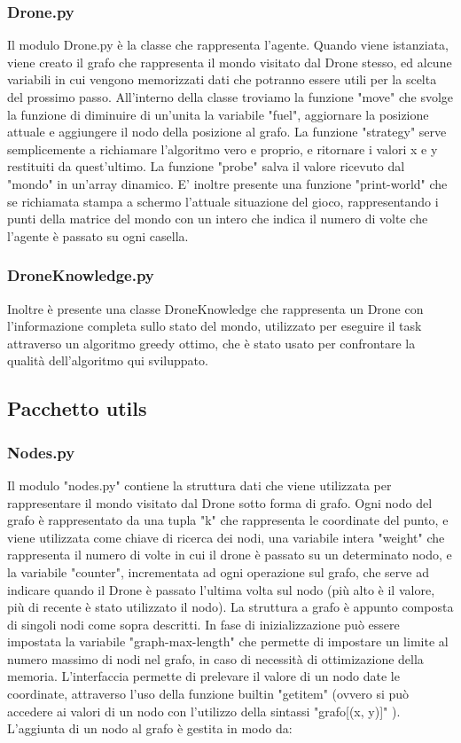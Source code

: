 \subsubsection{Drone.py}
Il modulo Drone.py è la classe che rappresenta l'agente. Quando viene istanziata, viene creato il grafo che rappresenta il mondo visitato dal Drone stesso, ed alcune variabili in cui vengono memorizzati dati che potranno essere utili per la scelta del prossimo passo. All'interno della classe troviamo la funzione "move" che svolge la funzione di diminuire di un'unita la variabile "fuel", aggiornare la posizione attuale e aggiungere il nodo della posizione al grafo. La funzione "strategy" serve semplicemente a richiamare l'algoritmo vero e proprio, e ritornare i valori x e y restituiti da quest'ultimo. La funzione "probe" salva il valore ricevuto dal "mondo" in un'array dinamico. E' inoltre presente una funzione "print-world" che se richiamata stampa a schermo l'attuale situazione del gioco, rappresentando i punti della matrice del mondo con un intero che indica il numero di volte che l'agente è passato su ogni casella.

\subsubsection{DroneKnowledge.py}
Inoltre è presente una classe DroneKnowledge che rappresenta un Drone con l'informazione completa sullo stato del mondo, utilizzato per eseguire il task attraverso un algoritmo greedy ottimo, che è stato usato per confrontare la qualità dell'algoritmo qui sviluppato.

\subsection{Pacchetto utils}

\subsubsection{Nodes.py}
Il modulo "nodes.py" contiene la struttura dati che viene utilizzata per rappresentare il mondo visitato dal Drone sotto forma di grafo. Ogni nodo del grafo è rappresentato da una tupla "k" che rappresenta le coordinate del punto, e viene utilizzata come chiave di ricerca dei nodi, una variabile intera "weight" che rappresenta il numero di volte in cui il drone è passato su un determinato nodo, e la variabile "counter", incrementata ad ogni operazione sul grafo, che serve ad indicare quando il Drone è passato l'ultima volta sul nodo (più alto è il valore, più di recente è stato utilizzato il nodo). 
La struttura a grafo è appunto composta di singoli nodi come sopra descritti. In fase di inizializzazione può essere impostata la variabile "graph-max-length" che permette di impostare un limite al numero massimo di nodi nel grafo, in caso di necessità di ottimizazione della memoria. L'interfaccia permette di prelevare il valore di un nodo date le coordinate, attraverso l'uso della funzione builtin "getitem" (ovvero si può accedere ai valori di un nodo con l'utilizzo della sintassi "grafo[(x, y)]" ). L'aggiunta di un nodo al grafo è gestita in modo da:


